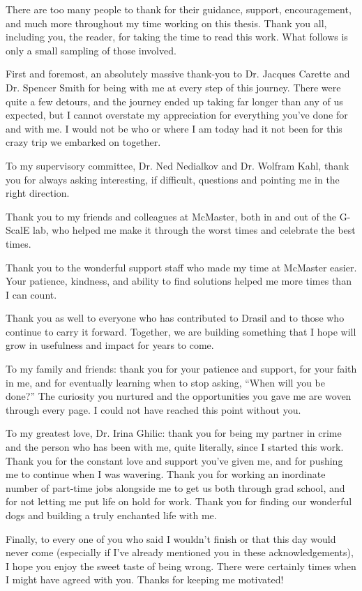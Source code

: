 
There are too many people to thank for their guidance, support, encouragement, 
and much more throughout my time working on this thesis. Thank you all, including you, 
the reader, for taking the time to read this work.
What follows is only a small sampling of those involved.

First and foremost, an absolutely massive thank-you to Dr. Jacques Carette and
Dr. Spencer Smith for being with me at every step of this journey. There were
quite a few detours, and the journey ended up taking far longer than any of us
expected, but I cannot overstate my appreciation for everything you've done for
and with me. I would not be who or where I am today had it not been for this
crazy trip we embarked on together.

To my supervisory committee, Dr. Ned Nedialkov and Dr. Wolfram Kahl, thank you 
for always asking interesting, if difficult, questions and pointing me in 
the right direction.

Thank you to my friends and colleagues at McMaster, both in and out of the 
G-ScalE lab, who helped me make it through the worst times and celebrate the best times.

Thank you to the wonderful support staff who made my time at McMaster easier.
Your patience, kindness, and ability to find solutions helped me more times 
than I can count.

Thank you as well to everyone who has contributed to Drasil and to those who 
continue to carry it forward. Together, we are building something that I hope
will grow in usefulness and impact for years to come.

To my family and friends: thank you for your patience and support, for your faith in me,
and for eventually learning when to stop asking, ``When will you be done?'' The 
curiosity you nurtured and the opportunities you gave me are woven through 
every page. I could not have reached this point without you.

To my greatest love, Dr. Irina Ghilic: thank you for being my partner in crime
and the person who has been with me, quite literally, since I started this work.
Thank you for the constant love and support you've given me, and for pushing me 
to continue when I was wavering. Thank you for working an inordinate number of 
part-time jobs alongside me to get us both through grad school, and for not
letting me put life on hold for work. Thank you for finding our wonderful dogs
and building a truly enchanted life with me.

Finally, to every one of you who said I wouldn't finish or that this day would
never come (especially if I've already mentioned you in these acknowledgements),
I hope you enjoy the sweet taste of being wrong. There were certainly times
when I might have agreed with you. Thanks for keeping me motivated!
